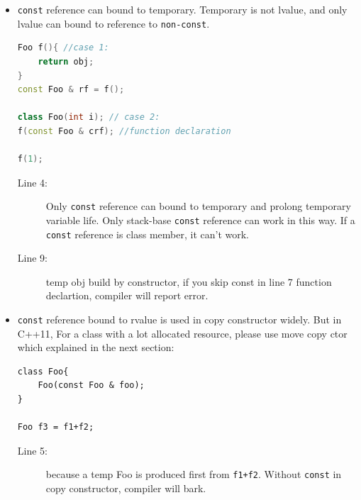 \documentclass[a4paper,11pt,twoside]{book}
\begin{document}
\begin{itemize}
\item  \texttt{const} reference can bound to temporary. Temporary is not lvalue, and only lvalue can bound to reference to \texttt{non-const}.   
\begin{lstlisting}[frame=single, language=c++]
Foo f(){ //case 1:
	return obj;
}
const Foo & rf = f();

class Foo(int i); // case 2:
f(const Foo & crf); //function declaration

f(1);
\end{lstlisting}
\begin{description}
	\item[Line 4:] Only \texttt{const} reference can bound to temporary and prolong temporary variable life. Only stack-base \texttt{const} reference can work in this way. If a \texttt{const} reference is class member, it can't work. 
	
	\item[Line 9:] temp obj build by constructor, if you skip const in line 7 function declartion, compiler will report error.
\end{description}

	\item \texttt{const} reference bound to rvalue is used in copy constructor widely. But in C++11, For a class with a lot allocated resource, please use move copy ctor which explained in the next section:

\begin{lstlisting}[]
class Foo{
	Foo(const Foo & foo);
}

Foo f3 = f1+f2;
\end{lstlisting}
\begin{description}
	\item[Line 5:] because a temp Foo is produced first from \texttt{f1+f2}. Without \texttt{const} in copy constructor, compiler will bark.
\end{description}

\end{itemize}
\end{document}
